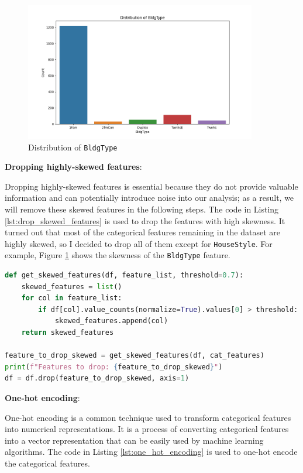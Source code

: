 \documentclass[10pt]{article}
\begin{document}
\begin{figure}[!htbp]
    \centering
    \includegraphics[width=0.9\textwidth]{../hw1/img/Part_I/BldgType.png}
    \caption{Distribution of \texttt{BldgType}}
    \label{fig:bldgtype}
\end{figure}

\textbf{Dropping highly-skewed features}:

Dropping highly-skewed features is essential because they do not provide valuable information and can potentially introduce noise into our analysis; as a result, we will remove these skewed features in the following steps. The code in Listing \ref{lst:drop_skewed_features} is used to drop the features with high skewness. It turned out that most of the categorical features remaining in the dataset are highly skewed, so I decided to drop all of them except for \texttt{HouseStyle}. For example, Figure \ref{fig:bldgtype} shows the skewness of the \texttt{BldgType} feature.

\begin{lstlisting}[language=Python, label={lst:drop_skewed_features}, caption={Drop the features with high skewness}]
def get_skewed_features(df, feature_list, threshold=0.7):
    skewed_features = list()
    for col in feature_list:
        if df[col].value_counts(normalize=True).values[0] > threshold:
            skewed_features.append(col)
    return skewed_features

feature_to_drop_skewed = get_skewed_features(df, cat_features)
print(f"Features to drop: {feature_to_drop_skewed}")
df = df.drop(feature_to_drop_skewed, axis=1)
\end{lstlisting}

\textbf{One-hot encoding}:

One-hot encoding is a common technique used to transform categorical features into numerical representations. It is a process of converting categorical features into a vector representation that can be easily used by machine learning algorithms. The code in Listing \ref{lst:one_hot_encoding} is used to one-hot encode the categorical features.
\end{document}
